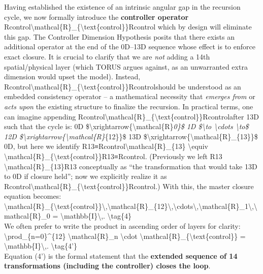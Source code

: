 \documentclass[]{article}
\begin{document}
{Having established the existence of an intrinsic angular gap in the
recursion cycle, we now formally introduce the \textbf{controller
operator}
Rcontrol\textbackslash{}mathcal\{R\}\_\{\textbackslash{}text\{control\}\}Rcontrol​
which by design will eliminate this gap. The Controller Dimension
Hypothesis posits that there exists an additional operator at the end of
the 0D--13D sequence whose effect is to enforce exact closure. It is
crucial to clarify that we are \emph{not} adding a 14th spatial/physical
layer (which TORUS argues against, as an unwarranted extra dimension
would upset the model​). Instead,
Rcontrol\textbackslash{}mathcal\{R\}\_\{\textbackslash{}text\{control\}\}Rcontrol​
should be understood as an embedded consistency operator -- a
mathematical necessity that \emph{emerges from} or \emph{acts upon} the
existing structure to finalize the recursion. In practical terms, one
can imagine appending
Rcontrol\textbackslash{}mathcal\{R\}\_\{\textbackslash{}text\{control\}\}Rcontrol​
after 13D such that the cycle is: 0D
\$\textbackslash{}xrightarrow\{\textbackslash{}mathcal\{R\}\emph{0\}\$
1D \$\textbackslash{}to \textbackslash{}cdots \textbackslash{}to\$ 12D
\$\textbackslash{}xrightarrow\{\textbackslash{}mathcal\{R\}}\{12\}\}\$
13D
\$\textbackslash{}xrightarrow\{\textbackslash{}mathcal\{R\}\_\{13\}\}\$
0D, but here we identify
R13≡Rcontrol\textbackslash{}mathcal\{R\}\_\{13\} \textbackslash{}equiv
\textbackslash{}mathcal\{R\}\_\{\textbackslash{}text\{control\}\}R13​≡Rcontrol​.
(Previously we left R13 \textbackslash{}mathcal\{R\}\_\{13\}R13​
conceptually as ``the transformation that would take 13D to 0D if
closure held''; now we explicitly realize it as
Rcontrol\textbackslash{}mathcal\{R\}\_\{\textbackslash{}text\{control\}\}Rcontrol​.)
With this, the master closure equation becomes:\\
\textbackslash{}mathcal\{R\}\_\{\textbackslash{}text\{control\}\}\textbackslash{},\textbackslash{}mathcal\{R\}\_\{12\}\textbackslash{},\textbackslash{}cdots\textbackslash{},\textbackslash{}mathcal\{R\}\_1\textbackslash{},\textbackslash{}mathcal\{R\}\_0
= \textbackslash{}mathbb\{I\}\textbackslash{},.
\textbackslash{}tag\{4\}\\
We often prefer to write the product in ascending order of layers for
clarity:\\
\textbackslash{}prod\_\{n=0\}\^{}\{12\} \textbackslash{}mathcal\{R\}\_n
\textbackslash{}cdot
\textbackslash{}mathcal\{R\}\_\{\textbackslash{}text\{control\}\} =
\textbackslash{}mathbb\{I\}\textbackslash{},.
\textbackslash{}tag\{4'\}\\
Equation (4') is the formal statement that the \textbf{extended sequence
of 14 transformations (including the controller) closes the loop}.

}
\end{document}
